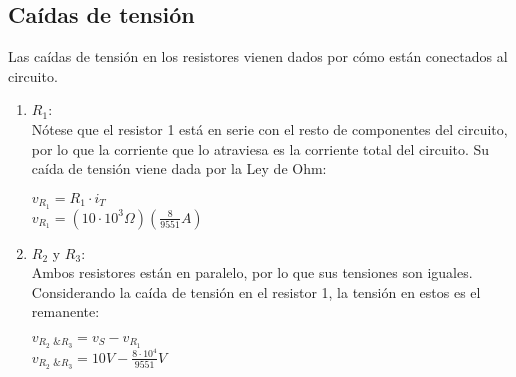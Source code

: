     \subsection{Caídas de tensión}
    \sangria{} Las caídas de tensión en los resistores vienen dados por cómo están conectados al circuito.
    \begin{enumerate}
        \item $R_1$: \\[5pt]
        \sangria{} Nótese que el resistor 1 está en serie con el resto de componentes del circuito, por lo que la corriente que lo atraviesa es la corriente total del circuito. Su caída de tensión viene dada por la Ley de Ohm:
        \begin{center}
            $v_{R_1} = R_1 \cdot i_T$ \\[10pt] 
            $v_{R_1} = (10 \cdot 10^3 \Omega)(\frac{8}{9551}A)$ \\[10pt] 
        \end{center}

        \item $R_2$ y $R_3:$ \\
            \sangria{} Ambos resistores están en paralelo, por lo que sus tensiones son iguales. \\ \sangria{}Considerando la caída de tensión en el resistor 1, la tensión en estos es el remanente:
        \begin{center} 
            $v_{\text{$R_2$ \& $R_3$}} = v_S - v_{R_1}$ \\[10pt]
            $v_{\text{$R_2$ \& $R_3$}} = 10V - \frac{8\cdot 10^4}{9551}V$ \\[10pt]
        \end{center}
    \end{enumerate}
